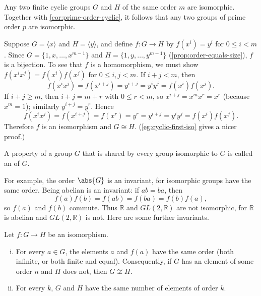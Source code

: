 \begin{eg}\label{eg:cyclic-iso}
	Any two finite cyclic groups \(G\) and \(H\) of the same order \(m\) are isomorphic.
	Together with \autoref{cor:prime-order-cyclic}, it follows that any two groups of prime
	order \(p\) are isomorphic.

	Suppose \(G = \langle x\rangle\) and \(H = \langle y\rangle\), and define
	\(f\colon G \to H\) by \(f(x^i) = y^i\) for \(0 \leq i < m\). Since
	\(G = \{1, x, \dots, x^{m-1}\}\) and \(H = \{1, y, \dots, y^{m-1}\}\)
	(\autoref{prop:order-equals-size}), \(f\) is a bijection. To see that \(f\) is a
	homomorphism, we must show \(f(x^ix^j) = f(x^i)f(x^j)\) for \(0 \leq i, j < m\). If
	\(i + j < m\), then
	\[
		f(x^ix^j) = f(x^{i+j}) = y^{i+j} = y^iy^j = f(x^i)f(x^j).
	\]
	If \(i + j \geq m\), then \(i + j = m + r\) with \(0 \leq r < m\), so
	\(x^{i+j} = x^mx^r = x^r\) (because \(x^m = 1\)); similarly \(y^{i+j} = y^r\). Hence
	\[
		f(x^ix^j) = f(x^{i+j}) = f(x^r) = y^r = y^{i+j} = y^iy^j = f(x^i)f(x^j).
	\]
	Therefore \(f\) is an isomorphism and \(G \cong H\). (\autoref{eg:cyclic-first-iso} gives
	a nicer proof.)
\end{eg}

\begin{definition}[Invariant]
	A property of a group \(G\) that is shared by every group isomorphic to \(G\) is called an
	 of \(G\).
\end{definition}

For example, the order \(\abs{G}\) is an invariant, for isomorphic groups have the same
order. Being abelian is an invariant: if \(ab = ba\), then
\[
	f(a)f(b) = f(ab) = f(ba) = f(b)f(a),
\]
so \(f(a)\) and \(f(b)\) commute. Thus \(\mathbb R\) and \(GL(2,\mathbb R)\) are not
isomorphic, for \(\mathbb R\) is abelian and \(GL(2,\mathbb R)\) is not. Here are some
further invariants.

\begin{lemma}\label{lem:order-invariant}
	Let \(f\colon G \to H\) be an isomorphism.
	\begin{enumerate}[(i)]
		\item For every \(a \in G\), the elements \(a\) and \(f(a)\) have the same order
		      (both infinite, or both finite and equal). Consequently, if \(G\) has an
		      element of some order \(n\) and \(H\) does not, then \(G \not\cong H\).
		\item For every \(k\), \(G\) and \(H\) have the same number of elements of
		      order \(k\).
	\end{enumerate}
\end{lemma}

